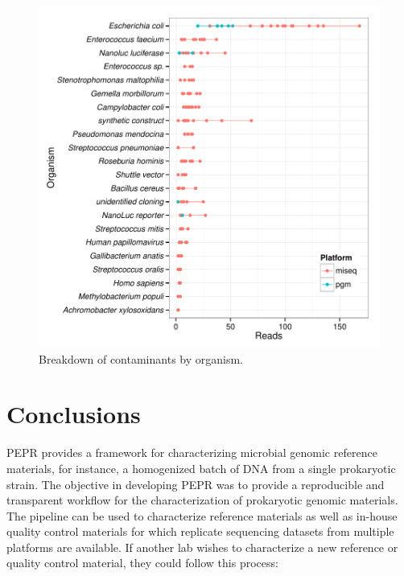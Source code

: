 \documentclass[smallextended]{svjour3}\usepackage[]{graphicx}\usepackage[]{color}
\makeatletter
\def\maxwidth{ %
  \ifdim\Gin@nat@width>\linewidth
    \linewidth
  \else
    \Gin@nat@width
  \fi
}
\newenvironment{knitrout}{}{} %
\makeatother
\begin{document}
\begin{knitrout}
\color{fgcolor}\begin{figure}

{\centering \includegraphics[width=\maxwidth]{figure/contamTaxaFig-1} 

}

\caption[Breakdown of contaminants by organism]{Breakdown of contaminants by organism.}\label{fig:contamTaxaFig}
\end{figure}


\end{knitrout}


\section{Conclusions}
PEPR provides a framework for characterizing microbial genomic reference materials, for instance, a homogenized batch of DNA from a single prokaryotic strain. 
The objective in developing PEPR was to provide a reproducible and transparent workflow for the characterization of prokaryotic genomic materials. 
The pipeline can be used to characterize reference materials as well as in-house quality control materials for which replicate sequencing datasets from multiple platforms are available. 
If another lab wishes to characterize a new reference or quality control material, they could follow this process:  
\end{document}
